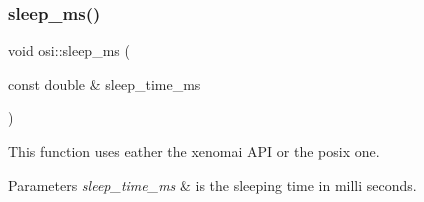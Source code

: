\subsubsection{\texorpdfstring{sleep\+\_\+ms()}{sleep\_ms()}}
{\footnotesize\ttfamily void osi\+::sleep\+\_\+ms (\begin{DoxyParamCaption}\item[{const double \&}]{sleep\+\_\+time\+\_\+ms }\end{DoxyParamCaption})\hspace{0.3cm}{\ttfamily [inline]}}



This function uses eather the xenomai A\+PI or the posix one. 


\begin{DoxyParams}{Parameters}
{\em sleep\+\_\+time\+\_\+ms} & is the sleeping time in milli seconds. \\
\hline
\end{DoxyParams}
